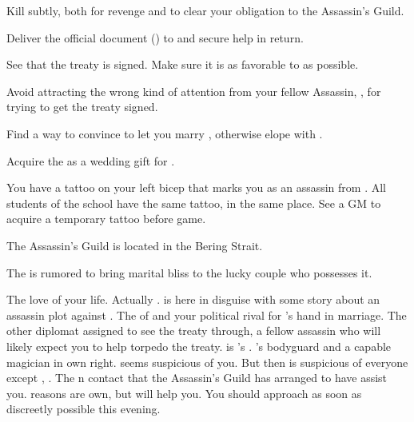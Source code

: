 \documentclass[char]{NeptuneBall}
\begin{document}
\begin{itemz}[Goals]
  \item Kill \cQueen{} subtly, both for revenge and to clear your obligation to the Assassin's Guild.
	\item Deliver the official document (\iBirthCertificate{\MYnumber}) to \cManta{} and secure \cManta{\their} help in return.
  \item See that the treaty is signed. Make sure it is as favorable to \pPacifica{} as possible.
	\item Avoid attracting the wrong kind of attention from your fellow Assassin, \cSpy{}, for trying to get the treaty signed.
  \item Find a way to convince \cKing{} to let you marry \cPrincess{}, otherwise elope with \cPrincess{}.  
  \item Acquire the \iGlowShell{} as a wedding gift for \cPrincess{}.
\end{itemz}

\begin{itemz}[Notes]
  \item You have a tattoo on your left bicep that marks you as an assassin from \pAssassin{}. All students of the school have the same tattoo, in the same place. See a GM to acquire a temporary tattoo before game.
\end{itemz}

\begin{itemz}[Trivia]
  \item The Assassin's Guild is located in the Bering Strait.
\end{itemz}

\begin{itemz}[Trivia]
  \item The \iGlowShell{\MYname} is rumored to bring marital bliss to the lucky couple who possesses it.
\end{itemz}

\begin{contacts}
  \contact{\cPrincess{}} The love of your life.
  \contact{\cQueen{\MYname}} Actually \cQueen{}. \cQueen{\They} is here in disguise with some story about an assassin plot against \cKing{\King} \cKing{}.
  \contact{\cPrince{}} The \cPrince{\prince} of \pPacifica{} and your political rival for \cPrincess{}'s hand in marriage.
  \contact{\cSpy{}} The other diplomat assigned to see the treaty through, a fellow assassin who will likely expect you to help torpedo the treaty. \cSpy{} is \cBodyguard{}'s \cSpy{\sibling}.
  \contact{\cBodyguard{}} \cPrince{}'s bodyguard and a capable magician in \cBodyguard{\their} own right. \cBodyguard{\They} seems suspicious of you. But then \cBodyguard{\they} is suspicious of everyone except \cBodyguard{\them} \cSpy{\sibling}, \cSpy{}.
  \contact{\cManta{}} The \pAtlantis{}n contact that the Assassin's Guild has arranged to have assist you. \cManta{\Their} reasons are \cManta{\their} own, but \cManta{\they} will help you. You should approach \cManta{\them} as soon as discreetly possible this evening.
\end{contacts}
\end{document}
